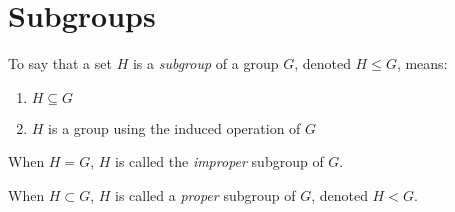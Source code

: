 \documentclass[letterpaper,12pt,fleqn]{article}
\begin{document}
\section*{Subgroups}

\begin{definition}
  To say that a set $H$ is a \emph{subgroup} of a group $G$, denoted $H\le G$,
  means:
  \begin{enumerate}
  \item{$H\subseteq G$}
  \item{$H$ is a group using the induced operation of $G$}
  \end{enumerate}
  When $H=G$, $H$ is called the \emph{improper} subgroup of $G$.
  
  When $H\subset G$, $H$ is called a \emph{proper} subgroup of $G$, denoted
  $H<G$.
\end{definition}
\end{document}
